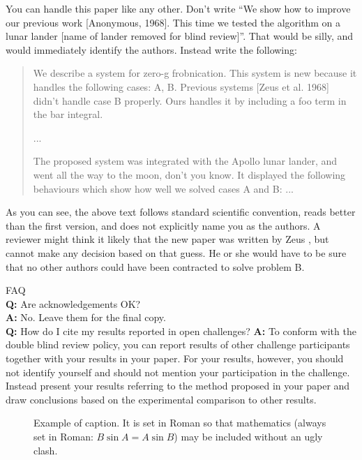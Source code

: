 \documentclass[10pt,twocolumn,letterpaper]{article}
\begin{document}
You can handle this paper like any other.  Don't write ``We show how to improve
our previous work [Anonymous, 1968].  This time we tested the algorithm on a
lunar lander [name of lander removed for blind review]''. That would be silly,
and would immediately identify the authors. Instead write the following:
\begin{quotation}
\noindent
   We describe a system for zero-g frobnication.  This system is new because it
   handles the following cases: A, B.  Previous systems [Zeus et al. 1968]
   didn't handle case B properly.  Ours handles it by including a foo term in
   the bar integral.

   ...

   The proposed system was integrated with the Apollo lunar lander, and went all
   the way to the moon, don't you know.  It displayed the following behaviours
   which show how well we solved cases A and B: ...
\end{quotation}
As you can see, the above text follows standard scientific convention, reads
better than the first version, and does not explicitly name you as the authors.
A reviewer might think it likely that the new paper was written by Zeus \etal,
but cannot make any decision based on that guess. He or she would have to be
sure that no other authors could have been contracted to solve problem B.
\medskip

\noindent
FAQ\medskip\\
{\bf Q:} Are acknowledgements OK?\\
{\bf A:} No.  Leave them for the final copy.\medskip\\
{\bf Q:} How do I cite my results reported in open challenges? {\bf A:} To
conform with the double blind review policy, you can report results of other
challenge participants together with your results in your paper. For your
results, however, you should not identify yourself and should not mention your
participation in the challenge. Instead present your results referring to the
method proposed in your paper and draw conclusions based on the experimental
comparison to other results.\medskip\\



\begin{figure}[t]
\begin{center}
\fbox{\rule{0pt}{2in} \rule{0.9\linewidth}{0pt}}
\end{center}
   \caption{Example of caption.  It is set in Roman so that mathematics (always
   set in Roman: $B \sin A = A \sin B$) may be included without an ugly clash.}
\label{fig:long}
\label{fig:onecol}
\end{figure}
\end{document}
